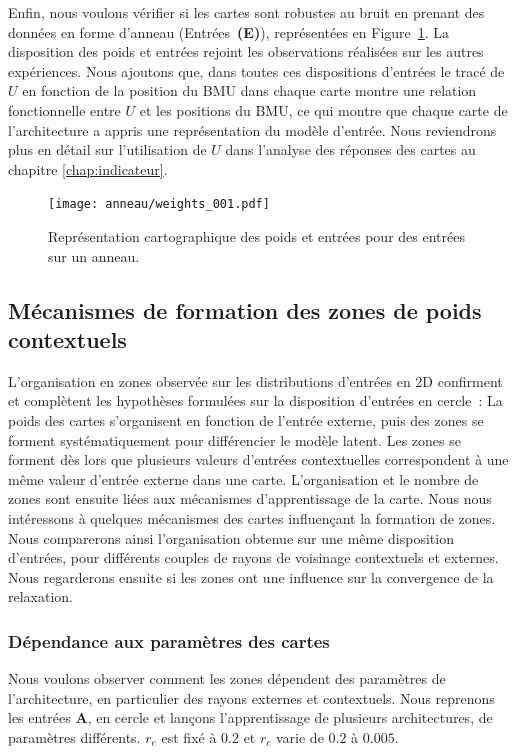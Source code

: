 \documentclass[../main]{subfiles}
\begin{document}
Enfin, nous voulons vérifier si les cartes sont robustes au bruit en prenant des données en forme d'anneau (Entrées~\textbf{(E)}), représentées en Figure~\ref{fig:anneau_w}. La disposition des poids et entrées rejoint les observations réalisées sur les autres expériences.
Nous ajoutons que, dans toutes ces dispositions d'entrées le tracé de $U$ en fonction de la position du BMU dans chaque carte montre une relation fonctionnelle entre $U$ et les positions du BMU, ce qui montre que chaque carte de l'architecture a appris une représentation du modèle d'entrée. Nous reviendrons plus en détail sur l'utilisation de $U$ dans l'analyse des réponses des cartes au chapitre \ref{chap:indicateur}.
\begin{figure}[H]
	\centering\texttt{[image: anneau/weights\_001.pdf]}
	\caption{Représentation cartographique des poids et entrées pour des entrées sur un anneau. \label{fig:anneau_w}}
\end{figure}

\subsection{Mécanismes de formation des zones de poids contextuels}

L'organisation en zones observée sur les distributions d'entrées en 2D confirment et complètent les hypothèses formulées sur la disposition d'entrées en cercle~:
La poids des cartes s'organisent en fonction de l'entrée externe, puis des zones se forment systématiquement pour différencier le modèle latent. Les zones se forment dès lors que plusieurs valeurs d'entrées contextuelles correspondent à une même valeur d'entrée externe dans une carte.
L'organisation et le nombre de zones sont ensuite liées aux mécanismes d'apprentissage de la carte.
Nous nous intéressons à quelques mécanismes des cartes influençant la formation de zones. 
Nous comparerons ainsi l'organisation obtenue sur une même disposition d'entrées, pour différents couples de rayons de voisinage contextuels et externes. 
Nous regarderons ensuite si les zones ont une influence sur la convergence de la relaxation.

\subsubsection{Dépendance aux paramètres des cartes}

Nous voulons observer comment les zones dépendent des paramètres de l'architecture, en particulier des rayons externes et contextuels.
Nous reprenons les entrées \textbf{A}, en cercle et lançons l'apprentissage de plusieurs architectures, de paramètres différents. $r_e$ est fixé à $0.2$ et $r_c$ varie de $0.2$ à $0.005$. 
\end{document}
